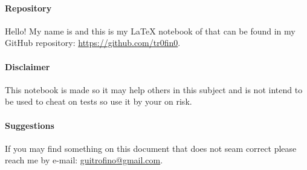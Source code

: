 \documentclass[class=article, crop=false]{standalone}
\begin{document}
\paragraph{Repository}Hello! My name is \@author\space and this is my LaTeX notebook of \@title\space that can be found in my GitHub repository: \url{https://github.com/tr0fin0}.

\paragraph{Disclaimer}This notebook is made so it may help others in this subject and is not intend to be used to cheat on tests so use it by your on risk.

\paragraph{Suggestions}If you may find something on this document that does not seam correct please reach me by e-mail: \url{guitrofino@gmail.com}.
\vspace{20mm}
\end{document}
